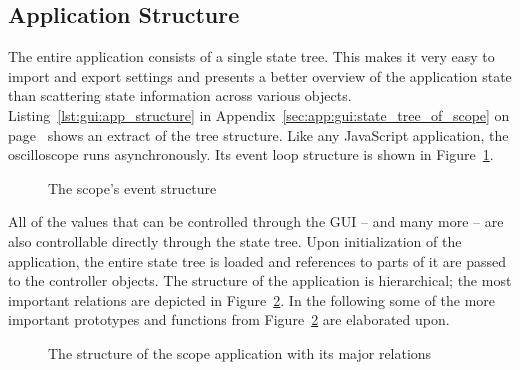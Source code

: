 %
%
\subsection{Application Structure} %
\label{subsec:gui:application_structure}


The  entire   application  consists  of   a  single  state   tree. This  makes
it   very   easy   to   import    and   export   settings   and   presents   a
better   overview   of   the   application   state   than   scattering   state
information   across  various   objects.   Listing~\ref{lst:gui:app_structure}
in              Appendix~\ref{sec:app:gui:state_tree_of_scope}              on
page~\pageref{sec:app:gui:state_tree_of_scope}   shows  an   extract  of   the
tree   structure. Like   any    JavaScript   application,   the   oscilloscope
runs    asynchronously. Its    event    loop    structure    is    shown    in
Figure~\ref{fig:gui:eventstructure}.

\begin{figure}
    \centering
    
    \caption[Scope Event Structure]{%
        The scope's event structure
    }
    \label{fig:gui:eventstructure}
\end{figure}

All of the values  that can be controlled through the GUI --  and many more --
are  also controllable  directly through  the state  tree. Upon initialization
of  the  application, the  entire  state  tree  is  loaded and  references  to
parts  of it  are passed  to  the controller  objects.  The  structure of  the
application  is hierarchical;  the most  important relations  are depicted  in
Figure~\ref{fig:gui:structure}.  In  the following some of  the more important
prototypes  and functions  from Figure~\ref{fig:gui:structure}  are elaborated
upon.

\begin{figure}
    \centering
    
    \caption[The scope structure]{%
        The structure of the scope application with its major relations%
    }
    \label{fig:gui:structure}
\end{figure}

